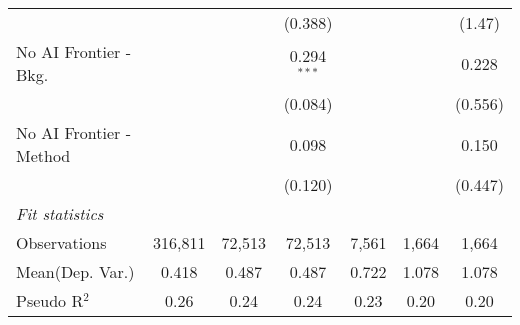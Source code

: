 \begin{tabular}{lcccccc}
                           &               &               & (0.388)       &               &       & (1.47)\\   
   No AI Frontier - Bkg.   &               &               & 0.294$^{***}$ &               &       & 0.228\\   
                           &               &               & (0.084)       &               &       & (0.556)\\   
   No AI Frontier - Method &               &               & 0.098         &               &       & 0.150\\   
                           &               &               & (0.120)       &               &       & (0.447)\\   
   \midrule
   \emph{Fit statistics}\\
   Observations            & 316,811       & 72,513        & 72,513        & 7,561         & 1,664 & 1,664\\  
Mean(Dep. Var.) & 0.418 & 0.487 & 0.487 & 0.722 & 1.078 & 1.078 \\
   Pseudo R$^2$            & 0.26          & 0.24          & 0.24          & 0.23          & 0.20  & 0.20\\  
   

\end{tabular}
